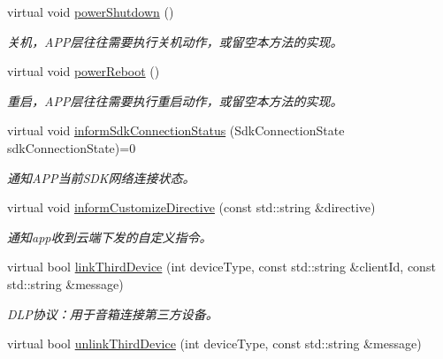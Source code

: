 \begin{DoxyCompactItemize}
virtual void \hyperlink{classduerOSDcsSDK_1_1sdkInterfaces_1_1ApplicationImplementation_a200b09dedd7dced2e41d8980901226e3}{power\+Shutdown} ()
\begin{DoxyCompactList}\small\item\em 关机，\+A\+P\+P层往往需要执行关机动作，或留空本方法的实现。 \end{DoxyCompactList}\item 
\mbox{\label{classduerOSDcsSDK_1_1sdkInterfaces_1_1ApplicationImplementation_a28300e1a0c2f3a41461a6d0a03b6299e}} 
virtual void \hyperlink{classduerOSDcsSDK_1_1sdkInterfaces_1_1ApplicationImplementation_a28300e1a0c2f3a41461a6d0a03b6299e}{power\+Reboot} ()
\begin{DoxyCompactList}\small\item\em 重启，\+A\+P\+P层往往需要执行重启动作，或留空本方法的实现。 \end{DoxyCompactList}\item 
virtual void \hyperlink{classduerOSDcsSDK_1_1sdkInterfaces_1_1ApplicationImplementation_ac839c88ccbafd6fba8e5899bd2f2dd55}{inform\+Sdk\+Connection\+Status} (Sdk\+Connection\+State sdk\+Connection\+State)=0
\begin{DoxyCompactList}\small\item\em 通知\+A\+P\+P当前\+S\+D\+K网络连接状态。 \end{DoxyCompactList}\item 
virtual void \hyperlink{classduerOSDcsSDK_1_1sdkInterfaces_1_1ApplicationImplementation_a239692cd30f184acb165447c9484cf9a}{inform\+Customize\+Directive} (const std\+::string \&directive)
\begin{DoxyCompactList}\small\item\em 通知app收到云端下发的自定义指令。 \end{DoxyCompactList}\item 
virtual bool \hyperlink{classduerOSDcsSDK_1_1sdkInterfaces_1_1ApplicationImplementation_aa4457826018c5fc361b29d141c723925}{link\+Third\+Device} (int device\+Type, const std\+::string \&client\+Id, const std\+::string \&message)
\begin{DoxyCompactList}\small\item\em D\+L\+P协议：用于音箱连接第三方设备。 \end{DoxyCompactList}\item 
virtual bool \hyperlink{classduerOSDcsSDK_1_1sdkInterfaces_1_1ApplicationImplementation_a18b9694bc2863798907a8572caa1b5da}{unlink\+Third\+Device} (int device\+Type, const std\+::string \&message)

\end{DoxyCompactItemize}
